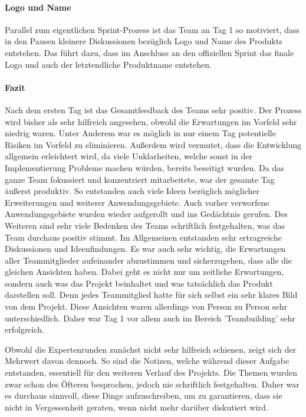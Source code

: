 \paragraph{Logo und Name}
Parallel zum eigentlichen Sprint-Prozess ist das Team an Tag 1 so motiviert, dass in den Pausen kleinere Diskussionen bezüglich Logo und Name des Produkts entstehen. Das führt dazu, dass im Anschluss an den offiziellen Sprint das finale Logo und auch der letztendliche Produktname entstehen.

\paragraph{Fazit}
Nach dem ersten Tag ist das Gesamtfeedback des Teams sehr positiv. Der Prozess wird bisher als sehr hilfreich angesehen, obwohl die Erwartungen im Vorfeld sehr niedrig waren. Unter Anderem war es möglich in nur einem Tag potentielle Risiken im Vorfeld zu eliminieren. Außerdem wird vermutet, dass die Entwicklung allgemein erleichtert wird, da viele Unklarheiten, welche sonst in der Implementierung Probleme machen würden, bereits beseitigt wurden. Da das ganze Team fokussiert und konzentriert mitarbeitete, war der gesamte Tag äußerst produktiv. So entstanden auch viele Ideen bezüglich möglicher Erweiterungen und weiterer Anwendungsgebiete. Auch vorher verworfene Anwendungsgebiete wurden wieder aufgerollt und ins Gedächtnis gerufen. Des Weiteren sind sehr viele Bedenken des Teams schriftlich festgehalten, was das Team durchaus positiv stimmt. Im Allgemeinen entstanden sehr ertragreiche Diskussionen und Ideenfindungen. Es war auch sehr wichtig, die Erwartungen aller Teammitglieder aufeinander abzustimmen und sicherzugehen, dass alle die gleichen Ansichten haben. Dabei geht es nicht nur um zeitliche Erwartungen, sondern auch was das Projekt beinhaltet und was tatsächlich das Produkt darstellen soll. Denn jedes Teammitglied hatte für sich selbst ein sehr klares Bild von dem Projekt. Diese Ansichten waren allerdings von Person zu Person sehr unterschiedlich. Daher war Tag 1 vor allem auch im Bereich 'Teambuilding' sehr erfolgreich.

Obwohl die Expertenrunden zunächst nicht sehr hilfreich schienen, zeigt sich der Mehrwert davon dennoch. So sind die Notizen, welche während dieser Aufgabe entstanden, essentiell für den weiteren Verlauf des Projekts. Die Themen wurden zwar schon des Öfteren besprochen, jedoch nie schriftlich festgehalten. Daher war es durchaus sinnvoll, diese Dinge aufzuschreiben, um zu garantieren, dass sie nicht in Vergessenheit geraten, wenn nicht mehr darüber diskutiert wird.

